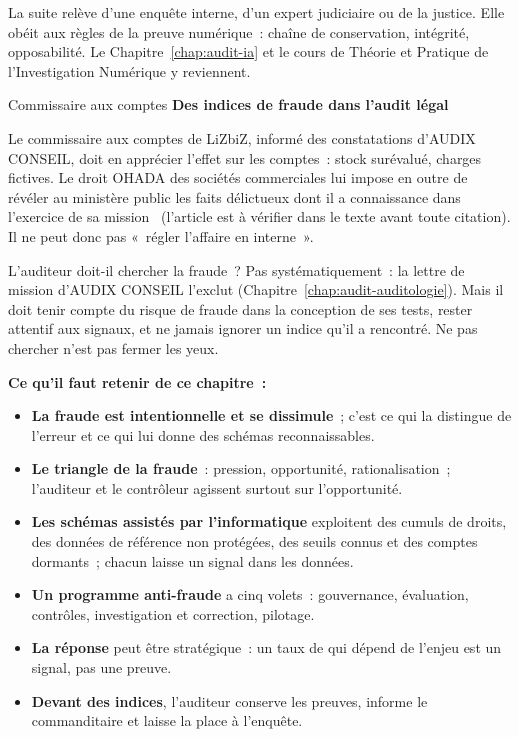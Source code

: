 La suite relève d'une enquête interne, d'un expert judiciaire ou de la
justice. Elle obéit aux règles de la preuve numérique~: chaîne de
conservation, intégrité, opposabilité. Le Chapitre~\ref{chap:audit-ia}
et le cours de Théorie et Pratique de l'Investigation Numérique y
reviennent.

\begin{boxmetier}{Commissaire aux comptes}
\textbf{Des indices de fraude dans l'audit légal}

Le commissaire aux comptes de LiZbiZ, informé des constatations d'AUDIX
CONSEIL, doit en apprécier l'effet sur les comptes~: stock surévalué,
charges fictives. Le droit OHADA des sociétés commerciales lui impose en
outre de révéler au ministère public les faits délictueux dont il a
connaissance dans l'exercice de sa mission~\cite{ohada2014auscgie}
(l'article est à vérifier dans le texte avant toute citation). Il ne peut
donc pas «~régler l'affaire en interne~».
\end{boxmetier}

\begin{boiteRemarque}{L'auditeur doit-il chercher la fraude~?}
Pas systématiquement~: la lettre de mission d'AUDIX CONSEIL l'exclut
(Chapitre~\ref{chap:audit-auditologie}). Mais il doit tenir compte du risque
de fraude dans la conception de ses tests, rester attentif aux signaux, et
ne jamais ignorer un indice qu'il a rencontré. Ne pas chercher n'est pas
fermer les yeux.
\end{boiteRemarque}

\separateur

\begin{boxresume}
\textbf{Ce qu'il faut retenir de ce chapitre~:}
\begin{itemize}
    \item \textbf{La fraude est intentionnelle et se dissimule}~; c'est ce
          qui la distingue de l'erreur et ce qui lui donne des schémas
          reconnaissables.
    \item \textbf{Le triangle de la fraude}~: pression, opportunité,
          rationalisation~; l'auditeur et le contrôleur agissent surtout sur
          l'opportunité.
    \item \textbf{Les schémas assistés par l'informatique} exploitent des
          cumuls de droits, des données de référence non protégées, des seuils
          connus et des comptes dormants~; chacun laisse un signal dans les
          données.
    \item \textbf{Un programme anti-fraude} a cinq volets~: gouvernance,
          évaluation, contrôles, investigation et correction, pilotage.
    \item \textbf{La réponse \NEK{}} peut être stratégique~: un taux de \NEK{}
          qui dépend de l'enjeu est un signal, pas une preuve.
    \item \textbf{Devant des indices}, l'auditeur conserve les preuves,
          informe le commanditaire et laisse la place à l'enquête.
\end{itemize}
\end{boxresume}

